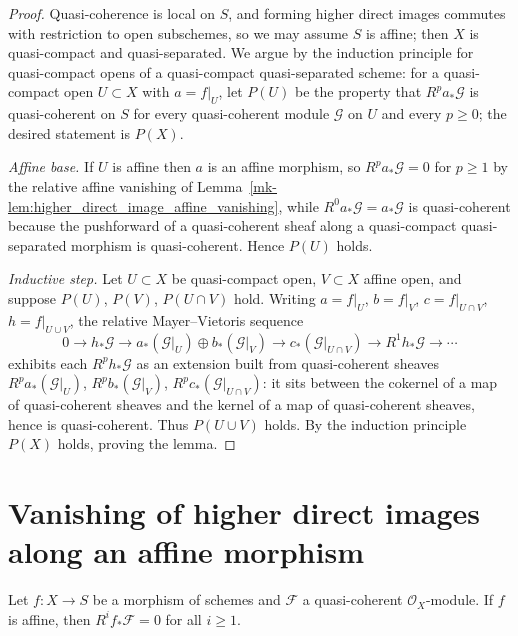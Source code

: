 \begin{proof}
  Quasi-coherence is local on \(S\), and forming higher direct images commutes
  with restriction to open subschemes, so we may assume \(S\) is affine; then
  \(X\) is quasi-compact and quasi-separated. We argue by the induction principle
  for quasi-compact opens of a quasi-compact quasi-separated scheme: for a
  quasi-compact open \(U \subset X\) with \(a = f|_U\), let \(P(U)\) be the
  property that \(R^p a_*\mathcal{G}\) is quasi-coherent on \(S\) for every
  quasi-coherent module \(\mathcal{G}\) on \(U\) and every \(p \geq 0\); the
  desired statement is \(P(X)\).

  \emph{Affine base.} If \(U\) is affine then \(a\) is an affine morphism, so
  \(R^p a_*\mathcal{G} = 0\) for \(p \geq 1\) by the relative affine vanishing of
  Lemma~\ref{mk-lem:higher_direct_image_affine_vanishing}, while
  \(R^0 a_*\mathcal{G} = a_*\mathcal{G}\) is quasi-coherent because the pushforward
  of a quasi-coherent sheaf along a quasi-compact quasi-separated morphism is
  quasi-coherent. Hence \(P(U)\) holds.

  \emph{Inductive step.} Let \(U \subset X\) be quasi-compact open, \(V \subset X\)
  affine open, and suppose \(P(U)\), \(P(V)\), \(P(U \cap V)\) hold. Writing
  \(a = f|_U\), \(b = f|_V\), \(c = f|_{U \cap V}\), \(h = f|_{U \cup V}\), the
  relative Mayer--Vietoris sequence
  \[
    0 \to h_*\mathcal{G} \to a_*(\mathcal{G}|_U) \oplus b_*(\mathcal{G}|_V)
      \to c_*(\mathcal{G}|_{U \cap V}) \to R^1 h_*\mathcal{G} \to \cdots
  \]
  exhibits each \(R^p h_*\mathcal{G}\) as an extension built from quasi-coherent
  sheaves \(R^p a_*(\mathcal{G}|_U)\), \(R^p b_*(\mathcal{G}|_V)\),
  \(R^p c_*(\mathcal{G}|_{U \cap V})\): it sits between the cokernel of a map of
  quasi-coherent sheaves and the kernel of a map of quasi-coherent sheaves, hence
  is quasi-coherent. Thus \(P(U \cup V)\) holds. By the induction principle
  \(P(X)\) holds, proving the lemma.
\end{proof}

\section{Vanishing of higher direct images along an affine morphism}

\begin{lemma}
  \label{mk-lem:higher_direct_image_affine_vanishing}
  Let \(f : X \to S\) be a morphism of schemes and \(\mathcal{F}\) a
  quasi-coherent \(\mathcal{O}_X\)-module. If \(f\) is affine, then
  \(R^i f_*\mathcal{F} = 0\) for all \(i \geq 1\).
\end{lemma}

